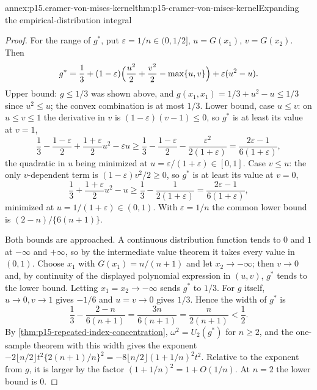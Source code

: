 \begin{annexitem}{annex:p15.cramer-von-mises-kernel}{thm:p15-cramer-von-mises-kernel}{Expanding the empirical-distribution integral}
\begin{proof}
For the range of \(g^*\), put \(\varepsilon=1/n\in(0,1/2]\),
\(u=G(x_1)\), \(v=G(x_2)\). Then
\[
 g^*=\frac13+(1-\varepsilon)\Bigl(\frac{u^2}2+\frac{v^2}2-\max\{u,v\}\Bigr)
 +\varepsilon(u^2-u).
\]
Upper bound: \(g\leq1/3\) was shown above, and
\(g(x_1,x_1)=1/3+u^2-u\leq1/3\) since \(u^2\leq u\); the convex
combination is at most \(1/3\).
Lower bound, case \(u\leq v\): on \(u\leq v\leq1\) the derivative in
\(v\) is \((1-\varepsilon)(v-1)\leq0\), so \(g^*\) is at least its value
at \(v=1\),
\[
 \frac13-\frac{1-\varepsilon}2+\frac{1+\varepsilon}2u^2-\varepsilon u
 \geq\frac13-\frac{1-\varepsilon}2-\frac{\varepsilon^2}{2(1+\varepsilon)}
 =\frac{2\varepsilon-1}{6(1+\varepsilon)},
\]
the quadratic in \(u\) being minimized at
\(u=\varepsilon/(1+\varepsilon)\in[0,1]\).
Case \(v\leq u\): the only \(v\)-dependent term is
\((1-\varepsilon)v^2/2\geq0\), so \(g^*\) is at least its value at
\(v=0\),
\[
 \frac13+\frac{1+\varepsilon}2u^2-u\geq\frac13-\frac1{2(1+\varepsilon)}
 =\frac{2\varepsilon-1}{6(1+\varepsilon)},
\]
minimized at \(u=1/(1+\varepsilon)\in(0,1)\).
With \(\varepsilon=1/n\) the common lower bound is \((2-n)/\{6(n+1)\}\).

Both bounds are approached. A continuous distribution function tends to
\(0\) and \(1\) at \(-\infty\) and \(+\infty\), so by the intermediate
value theorem it takes every value in \((0,1)\). Choose \(x_1\) with
\(G(x_1)=n/(n+1)\) and let \(x_2\to-\infty\); then \(v\to0\) and, by
continuity of the displayed polynomial expression in \((u,v)\),
\(g^*\) tends to the lower bound. Letting \(x_1=x_2\to-\infty\) sends
\(g^*\) to \(1/3\). For \(g\) itself, \(u\to0,v\to1\) gives \(-1/6\)
and \(u=v\to0\) gives \(1/3\). Hence the width of \(g^*\) is
\[
 \frac13-\frac{2-n}{6(n+1)}=\frac{3n}{6(n+1)}=\frac n{2(n+1)}<\frac12.
\]
By \cref{thm:p15-repeated-index-concentration}, \(\omega^2=U_2(g^*)\)
for \(n\geq2\), and the one-sample theorem with this width gives the
exponent \(-2\lfloor n/2\rfloor t^2\{2(n+1)/n\}^2
=-8\lfloor n/2\rfloor(1+1/n)^2t^2\).
Relative to the exponent from \(g\), it is larger by the factor
\((1+1/n)^2=1+O(1/n)\). At \(n=2\) the lower bound is \(0\).
\end{proof}
\end{annexitem}

